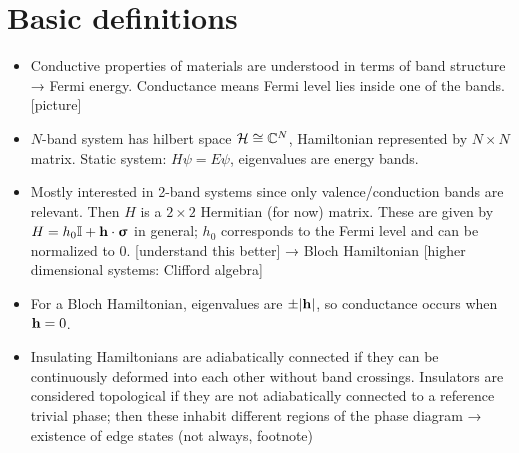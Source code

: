 



\section{Basic definitions}
{\color{blue}
\begin{itemize}
	\item Conductive properties of materials are understood in terms of band structure → Fermi energy. Conductance means Fermi level lies inside one of the bands. [picture]
	
	\item $N$-band system has hilbert space $\mathcal{H}\cong\mathbb{C}^N$, Hamiltonian represented by $N\times N$ matrix. Static system: $H\psi = E\psi$, eigenvalues are energy bands.
	
	\item Mostly interested in 2-band systems since only valence/conduction bands are relevant. Then $H$ is a $2\times 2$ Hermitian (for now) matrix. These are given by $H = h_0\mathbb{I} + \vb{h}\cdot\bm{\upsigma}$ in general; $h_0$ corresponds to the Fermi level and can be normalized to 0. [understand this better] → Bloch Hamiltonian [higher dimensional systems: Clifford algebra]
	
	\item For a Bloch Hamiltonian, eigenvalues are $\pm\abs{\vb{h}}$, so conductance occurs when $\vb{h} = 0$.
	
	\item Insulating Hamiltonians are adiabatically connected if they can be continuously deformed into each other without band crossings. Insulators are considered topological if they are not adiabatically connected to a reference trivial phase; then these inhabit different regions of the phase diagram → existence of edge states (not always\cite{Bernevig_topological-insulators}, footnote)
\end{itemize}
}

